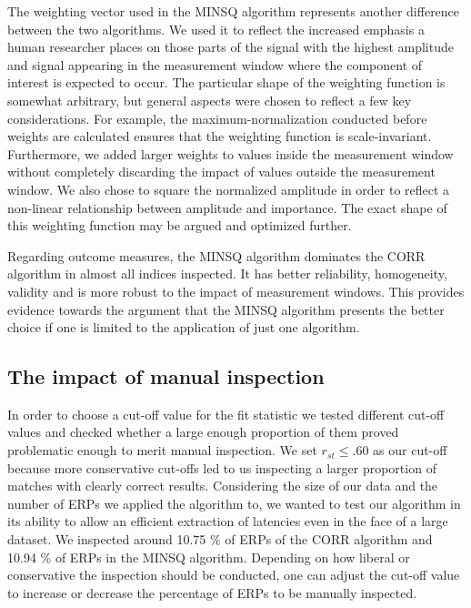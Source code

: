 \documentclass[
  man]{apa7}
\begin{document}
The weighting vector used in the MINSQ algorithm represents another difference between the two algorithms. We used it to reflect the increased emphasis a human researcher places on those parts of the signal with the highest amplitude and signal appearing in the measurement window where the component of interest is expected to occur. The particular shape of the weighting function is somewhat arbitrary, but general aspects were chosen to reflect a few key considerations. For example, the maximum-normalization conducted before weights are calculated ensures that the weighting function is scale-invariant. Furthermore, we added larger weights to values inside the measurement window without completely discarding the impact of values outside the measurement window. We also chose to square the normalized amplitude in order to reflect a non-linear relationship between amplitude and importance. The exact shape of this weighting function may be argued and optimized further.

Regarding outcome measures, the MINSQ algorithm dominates the CORR algorithm in almost all indices inspected. It has better reliability, homogeneity, validity and is more robust to the impact of measurement windows. This provides evidence towards the argument that the MINSQ algorithm presents the better choice if one is limited to the application of just one algorithm.

\hypertarget{the-impact-of-manual-inspection}{%
\subsection{The impact of manual inspection}\label{the-impact-of-manual-inspection}}

In order to choose a cut-off value for the fit statistic we tested different cut-off values and checked whether a large enough proportion of them proved problematic enough to merit manual inspection. We set \(r_{st} \le .60\) as our cut-off because more conservative cut-offs led to us inspecting a larger proportion of matches with clearly correct results. Considering the size of our data and the number of ERPs we applied the algorithm to, we wanted to test our algorithm in its ability to allow an efficient extraction of latencies even in the face of a large dataset. We inspected around 10.75 \% of ERPs of the CORR algorithm and 10.94 \% of ERPs in the MINSQ algorithm. Depending on how liberal or conservative the inspection should be conducted, one can adjust the cut-off value to increase or decrease the percentage of ERPs to be manually inspected.
\end{document}

